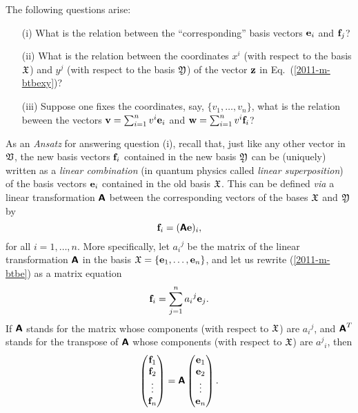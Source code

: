 The following questions arise:
\begin{itemize}
\item[(i)]
What is the relation between the ``corresponding'' basis vectors ${\bf e}_i$ and ${\bf f}_j$?
\item[(ii)]
What is the relation between the coordinates $x^i$ (with respect to the basis  ${\frak X}$) and $y^j$ (with respect to the basis  ${\frak Y}$)  of the vector ${\bf z}$ in Eq.~(\ref{2011-m-btbexy})?
\item[(iii)]
Suppose one fixes the coordinates, say, $\{
{v}_1,
\ldots ,
{v}_n
\}$, what is the relation beween the vectors
${\bf v}=
\sum_{i=1}^n v^i{\bf e}_i
$
and
${\bf w}=
\sum_{i=1}^n v^i{\bf f}_i
$?
\end{itemize}

As an {\it Ansatz} for answering question (i), recall that, just like any other vector in ${\frak V}$,
the new basis vectors ${\bf f}_i$ contained in the new basis ${\frak Y}$
can be (uniquely) written as a {\em linear combination}
(in quantum physics called {\em linear superposition})
of the basis vectors
${\bf e}_i$ contained in the old  basis ${\frak X}$.
This can be defined {\it via}
a linear transformation $\textsf{\textbf{A}}$ between the corresponding vectors of the bases
 ${\frak X}$ and
${\frak Y}$ by
\begin{equation}
{\bf f}_i= (\textsf{\textbf{A}}{\bf e})_i
,
\label{2011-m-btbe}
\end{equation}
for all $i=1, \ldots , n$.
%
More specifically, let ${a_i}^j$ be the matrix of the linear transformation $\textsf{\textbf{A}}$
in the basis
${\frak X}
=
\{
{\bf e}_1,
\ldots ,
{\bf e}_n
\}$,
and let us rewrite (\ref{2011-m-btbe}) as a matrix equation
\begin{equation}
{\bf f}_i= \sum_{j=1}^n {a_i}^j {\bf e}_j
.
\label{2011-m-btbe-r}
\end{equation}
If $\textsf{\textbf{A}}$ stands for the matrix whose components (with respect to ${\frak X}$) are  ${a_i}^j$,
and $\textsf{\textbf{A}}^T$
stands for the transpose of $\textsf{\textbf{A}}$
whose components (with respect to ${\frak X}$) are  ${a^j}_i$,
then
\begin{equation}
\begin{pmatrix}
{\bf f}_1\\
{\bf f}_2\\
\vdots\\
{\bf f}_n
\end{pmatrix}
= \textsf{\textbf{A}}
\begin{pmatrix}
{\bf e}_1\\
{\bf e}_2\\
\vdots\\
{\bf e}_n
\end{pmatrix}
.
\label{2011-m-btbe-r1}
\end{equation}

